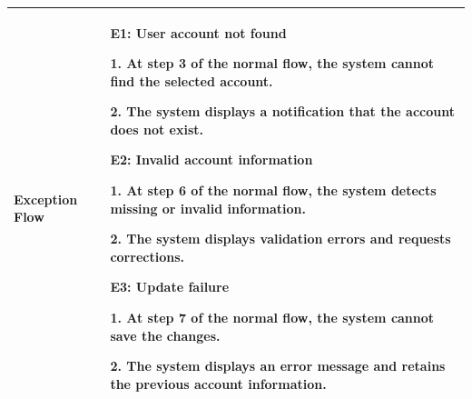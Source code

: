 \begin{longtable}{|>{\bfseries\raggedright\arraybackslash}p{}|>{\raggedright\arraybackslash}p{}|}
Exception Flow &
\textbf{E1: User account not found} \par
1. At step 3 of the normal flow, the system cannot find the selected account. \par
2. The system displays a notification that the account does not exist. \par\vspace{4pt}
\textbf{E2: Invalid account information} \par
1. At step 6 of the normal flow, the system detects missing or invalid information. \par
2. The system displays validation errors and requests corrections. \par\vspace{4pt}
\textbf{E3: Update failure} \par
1. At step 7 of the normal flow, the system cannot save the changes. \par
2. The system displays an error message and retains the previous account information. \\ \hline
\end{longtable}


